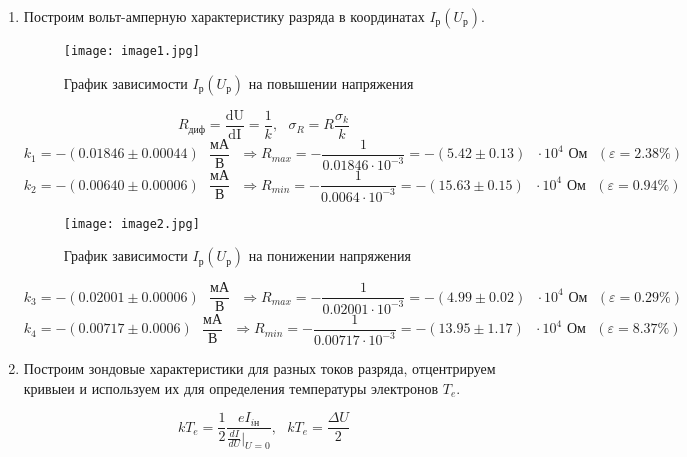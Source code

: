 \documentclass[a4paper,12pt]{article} %
\begin{document}
\begin{enumerate}
    \item Построим вольт-амперную характеристику разряда в координатах $I_{\text{р}}(U_{\text{р}})$.

    \begin{figure}[h]
        \begin{center}
    		\texttt{[image: image1.jpg]}
        \end{center}
        \caption{График зависимости $I_{\text{р}}(U_{\text{р}})$ на повышении напряжения}
        \label{plot1}
    \end{figure}

    \[ R_{\text{диф}} = \frac{\text{dU}}{\text{dI}} = \frac{1}{k}, \text{ } \sigma_{R} = R \frac{\sigma_{k}}{k} \]
    \[ k_{1} = -(0.01846 \pm 0.00044) \text{ } \frac{\text{мА}}{\text{В}} \text{ } \Longrightarrow R_{max} = -\frac{1}{0.01846 \cdot 10^{-3}} = -(5.42 \pm 0.13) \text{ } \cdot 10^{4} \text{ Ом} \text{ } (\varepsilon=2.38\%) \]
    \[ k_{2} = -(0.00640 \pm 0.00006) \text{ } \frac{\text{мА}}{\text{В}} \text{ } \Longrightarrow R_{min} = -\frac{1}{0.0064 \cdot 10^{-3}} = -(15.63 \pm 0.15) \text{ } \cdot 10^{4} \text{ Ом} \text{ } (\varepsilon=0.94\%) \]

    \newpage

    \begin{figure}[h]
        \begin{center}
    		\texttt{[image: image2.jpg]}
        \end{center}
        \caption{График зависимости $I_{\text{р}}(U_{\text{р}})$ на понижении напряжения}
        \label{plot2}
    \end{figure}

    \[ k_{3} = -(0.02001 \pm 0.00006) \text{ } \frac{\text{мА}}{\text{В}} \text{ } \Longrightarrow R_{max} = -\frac{1}{0.02001 \cdot 10^{-3}} = -(4.99 \pm 0.02) \text{ } \cdot 10^{4} \text{ Ом} \text{ } (\varepsilon=0.29\%) \]
    \[ k_{4} = -(0.00717 \pm 0.0006) \text{ } \frac{\text{мА}}{\text{В}} \text{ } \Longrightarrow R_{min} = -\frac{1}{0.00717 \cdot 10^{-3}} = -(13.95 \pm 1.17) \text{ } \cdot 10^{4} \text{ Ом} \text{ } (\varepsilon=8.37\%) \]

    \newpage

    \item Построим зондовые характеристики для разных токов разряда, отцентрируем кривыеи и используем их для определения температуры электронов $T_{e}$.

    \[ kT_{e} = \frac{1}{2}\frac{eI_{i\text{н}}}{\frac{dI}{dU}|_{U=0}}, \text{ } kT_{e} = \frac{\Delta U}{2} \]
    

\end{enumerate}
\end{document}
